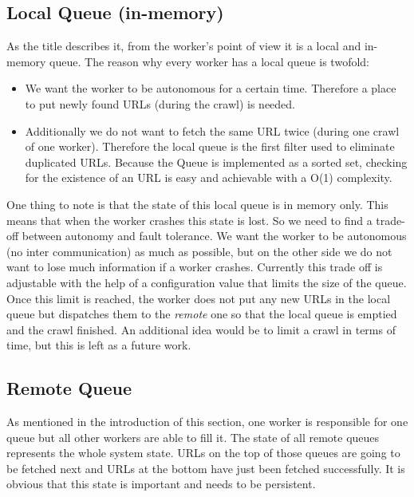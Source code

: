 \subsection{Local Queue (in-memory)}
\label{queues_local}
As the title describes it, from the worker's point of view it is a local and in-memory queue. The reason why every worker has a local queue is twofold:
\begin{itemize}
  \item We want the worker to be autonomous for a certain time. Therefore a place to put newly found URLs (during the crawl) is needed.
  \item Additionally we do not want to fetch the same URL twice (during one crawl of one worker). Therefore the local queue is the first filter used to eliminate duplicated URLs. Because the Queue is implemented as a sorted set, checking for the existence of an URL is easy and achievable with a O(1) complexity.
\end{itemize}

One thing to note is that the state of this local queue is in memory only. This means that when the worker crashes this state is lost. So we need to find a trade-off between autonomy and fault tolerance. We want the worker to be autonomous (no inter communication) as much as possible, but on the other side we do not want to lose much information if a worker crashes. Currently this trade off is adjustable with the help of a configuration value that limits the size of the queue. Once this limit is reached, the worker does not put any new URLs in the local queue but dispatches them to the \emph{remote} one so that the local queue is emptied and the crawl finished. An additional idea would be to limit a crawl in terms of time, but this is left as a future work.

\subsection{Remote Queue}
\label{queues_remote}
As mentioned in the introduction of this section, one worker is responsible for one queue but all other workers are able to fill it. The state of all remote queues represents the whole system state. URLs on the top of those queues are going to be fetched next and URLs at the bottom have just been fetched successfully. It is obvious that this state is important and needs to be persistent. 


